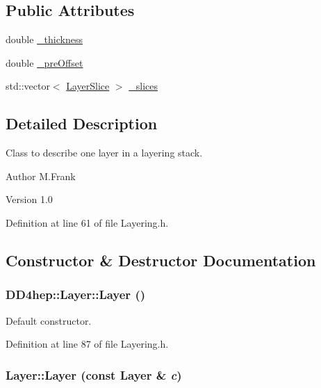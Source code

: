 \subsection*{Public Attributes}
\begin{DoxyCompactItemize}
\item 
double \hyperlink{class_d_d4hep_1_1_layer_afe2f78c9d1a66a6956deded6c4f7a7e1}{\_\-thickness}
\item 
double \hyperlink{class_d_d4hep_1_1_layer_a1160c69a0ac9822a0cc9c0c0c7ceac73}{\_\-preOffset}
\item 
std::vector$<$ \hyperlink{class_d_d4hep_1_1_layer_slice}{LayerSlice} $>$ \hyperlink{class_d_d4hep_1_1_layer_a45011afeb7fafcefe3de7275a50e5aaf}{\_\-slices}
\end{DoxyCompactItemize}


\subsection{Detailed Description}
Class to describe one layer in a layering stack. \begin{DoxyAuthor}{Author}
M.Frank 
\end{DoxyAuthor}
\begin{DoxyVersion}{Version}
1.0 
\end{DoxyVersion}


Definition at line 61 of file Layering.h.

\subsection{Constructor \& Destructor Documentation}
\hypertarget{class_d_d4hep_1_1_layer_a23e603ff080b2c6e9a9016b401fdac20}{
\subsubsection[{Layer}]{\setlength{\rightskip}{0pt plus 5cm}DD4hep::Layer::Layer ()}}
\label{class_d_d4hep_1_1_layer_a23e603ff080b2c6e9a9016b401fdac20}


Default constructor. 

Definition at line 87 of file Layering.h.\hypertarget{class_d_d4hep_1_1_layer_ad051c4b9774da0a2196045ef138d59b4}{
\subsubsection[{Layer}]{\setlength{\rightskip}{0pt plus 5cm}Layer::Layer (const {\bf Layer} \& {\em c})}}
\label{class_d_d4hep_1_1_layer_ad051c4b9774da0a2196045ef138d59b4}


